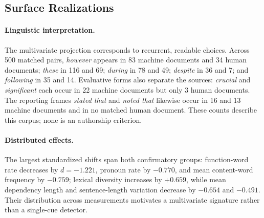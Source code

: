 \subsection{Surface Realizations}
\label{app:features}

\paragraph{Linguistic interpretation.} The multivariate projection corresponds to recurrent, readable choices. Across 500 matched pairs, \emph{however} appears in 83 machine documents and 34 human documents; \emph{these} in 116 and 69; \emph{during} in 78 and 49; \emph{despite} in 36 and 7; and \emph{following} in 35 and 14. Evaluative forms also separate the sources: \emph{crucial} and \emph{significant} each occur in 22 machine documents but only 3 human documents. The reporting frames \emph{stated that} and \emph{noted that} likewise occur in 16 and 13 machine documents and in no matched human document. These counts describe this corpus; none is an authorship criterion.

\paragraph{Distributed effects.} The largest standardized shifts span both confirmatory groups: function-word rate decreases by \(d=-1.221\), pronoun rate by \(-0.770\), and mean content-word frequency by \(-0.759\); lexical diversity increases by \(+0.659\), while mean dependency length and sentence-length variation decrease by \(-0.654\) and \(-0.491\). Their distribution across measurements motivates a multivariate signature rather than a single-cue detector.

